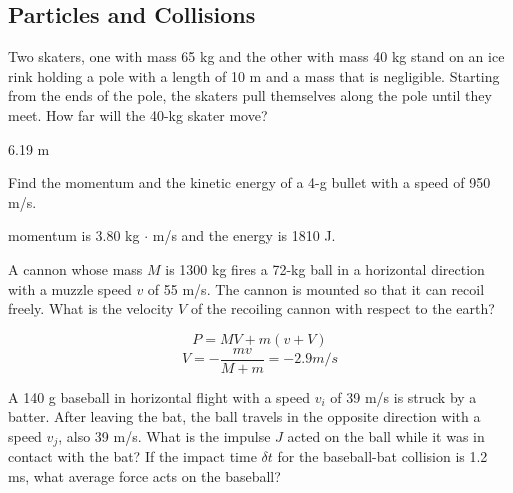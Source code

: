 \begin{questions}

\section{Particles and Collisions}

\question[2] Two skaters, one with mass 65 kg and the other with mass
40 kg stand on an ice rink holding a pole with a length of 10 m and a
mass that is negligible. Starting from the ends of the pole, the
skaters pull themselves along the pole until they meet. How far will
the 40-kg skater move?

\begin{solution}
  6.19 m
\end{solution}

\question[2] Find the momentum and the kinetic energy of a 4-g bullet
with a speed of 950 m/s.

\begin{solution}
  momentum is 3.80 kg $\cdot$ m/s and the energy is 1810 J.
\end{solution}

\question[2] A cannon whose mass $M$ is 1300 kg fires a 72-kg ball in
a horizontal direction with a muzzle speed $v$ of 55 m/s. The cannon
is mounted so that it can recoil freely. What is the velocity $V$ of
the recoiling cannon with respect to the earth?

\begin{solution}
  $$P = MV + m(v + V)$$
  $$V = -\frac{mv}{M + m} = -2.9 m/s$$
\end{solution}

\question[4] A 140 g baseball in horizontal flight with a speed $v_i$
of 39 m/s is struck by a batter. After leaving the bat, the ball
travels in the opposite direction with a speed $v_j$, also 39
m/s. What is the impulse $J$ acted on the ball while it was in contact
with the bat? If the impact time $\delta t$ for the baseball-bat
collision is 1.2 ms, what average force acts on the baseball?


\end{questions}
